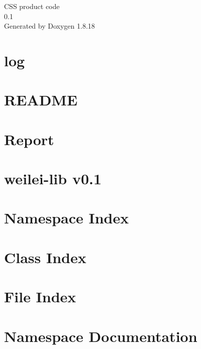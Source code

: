 \let\mypdfximage\pdfximage\def\pdfximage{\immediate\mypdfximage}\documentclass[twoside]{book}
\newcommand{\+}{\discretionary{\mbox{\scriptsize$\hookleftarrow$}}{}{}}
\newcommand{\clearemptydoublepage}{%
  \newpage{\pagestyle{empty}\cleardoublepage}%
}
\begin{document}
\hypersetup{pageanchor=false,
             bookmarksnumbered=true,
             pdfencoding=unicode
            }
\begin{titlepage}
\vspace*{7cm}
\begin{center}%
{\Large C\+SS product code \\[1ex]\large 0.\+1 }\\
\vspace*{1cm}
{\large Generated by Doxygen 1.8.18}\\
\end{center}
\end{titlepage}
\clearemptydoublepage
{}
\tableofcontents
\clearemptydoublepage
{}
\hypersetup{pageanchor=true}

\chapter{log}
\label{md_log_readme}

\chapter{R\+E\+A\+D\+ME}
\label{md__r_e_a_d_m_e}

\chapter{Report}
\label{md_report__r_e_a_d_m_e}

\chapter{weilei-\/lib v0.1}
\label{md_weilei_lib__r_e_a_d_m_e}

\chapter{Namespace Index}

\chapter{Class Index}

\chapter{File Index}

\chapter{Namespace Documentation}

\end{document}
